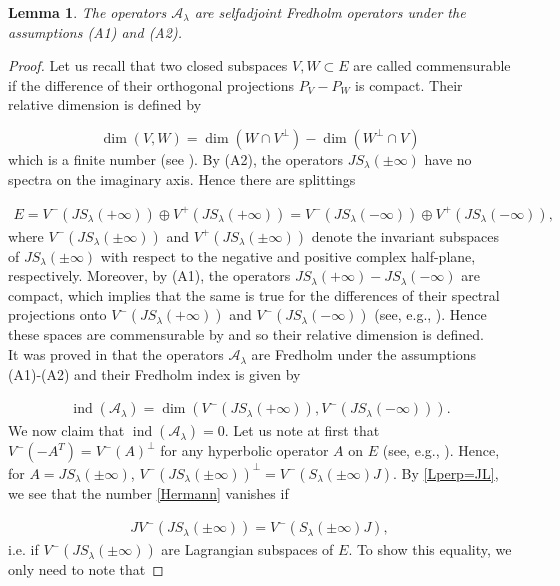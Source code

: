 \documentclass[a4paper,10pt]{article}
\newtheorem{lemma}[theorem]{Lemma}
\DeclareMathOperator{\ind}{ind}
\begin{document}
\begin{lemma}\label{lem-AFredholm}
The operators $\mathcal{A}_\lambda$ are selfadjoint Fredholm operators under the assumptions (A1) and (A2).
\end{lemma}

\begin{proof}
Let us recall that two closed subspaces $V,W\subset E$ are called commensurable if the difference of their orthogonal projections $P_V-P_W$ is compact. Their relative dimension is defined by 

\[\dim(V,W)=\dim(W\cap V^\perp)-\dim(W^\perp\cap V)\]
which is a finite number (see \cite[\S 2]{AlbertoBuch}). By (A2), the operators $J S_\lambda(\pm\infty)$ have no spectra on the imaginary axis. Hence there are splittings 

\begin{align}\label{splittingstableunstable}
E=V^-(JS_\lambda(+\infty))\oplus V^+(JS_\lambda(+\infty))=V^-(JS_\lambda(-\infty))\oplus V^+(JS_\lambda(-\infty)),
\end{align}
where $V^-(JS_\lambda(\pm\infty))$ and $V^+(JS_\lambda(\pm\infty))$ denote the invariant subspaces of $JS_\lambda(\pm\infty)$ with respect to the negative and positive complex half-plane, respectively. Moreover, by (A1), the operators $JS_\lambda(+\infty)-JS_\lambda(-\infty)$ are compact, which implies that the same is true for the differences of their spectral projections onto $V^-(JS_\lambda(+\infty))$ and $V^-(JS_\lambda(-\infty))$ (see, e.g., \cite[Lemma 3.2]{AlbertoODE}). Hence these spaces are commensurable by \cite[Lemma 3.3]{AlbertoODE} and so their relative dimension is defined.\\
It was proved in \cite[Thm. B]{AlbertoODE} that the operators $\mathcal{A}_\lambda$ are Fredholm under the assumptions (A1)-(A2) and their Fredholm index is given by

\begin{align}\label{Hermann}
\ind(\mathcal{A}_\lambda)=\dim(V^-(JS_\lambda(+\infty)),V^-(JS_\lambda(-\infty))).
\end{align}
We now claim that $\ind(\mathcal{A}_\lambda)=0$. Let us note at first that $V^-(-A^T)=V^-(A)^\perp$ for any hyperbolic operator $A$ on $E$ (see, e.g., \cite[\S 1]{AlbertoODE}). Hence, for $A=JS_\lambda(\pm\infty)$, $V^-(JS_\lambda(\pm\infty))^\perp=V^-(S_\lambda(\pm\infty)J)$. By \eqref{Lperp=JL}, we see that the number \eqref{Hermann} vanishes if 

\begin{align}\label{indA=0}
JV^-(JS_\lambda(\pm\infty))=V^-(S_\lambda(\pm\infty)J),
\end{align}   
i.e. if $V^-(JS_\lambda(\pm\infty))$ are Lagrangian subspaces of $E$. To show this equality, we only need to note that 


\end{proof}
\end{document}
